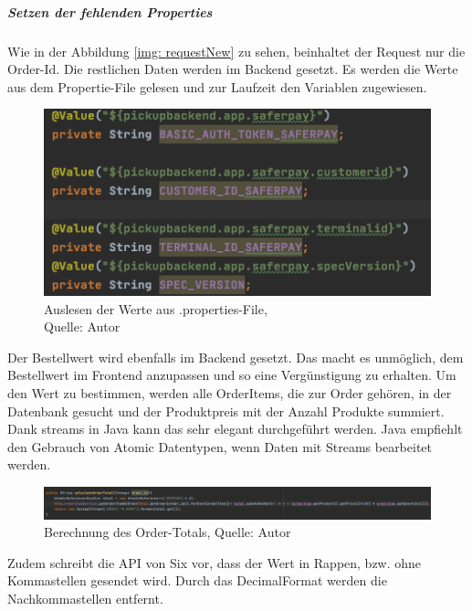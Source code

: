 \subparagraph{Setzen der fehlenden Properties}
Wie in der Abbildung \ref{img: requestNew} zu sehen, beinhaltet der Request nur die Order-Id. Die restlichen Daten werden im Backend gesetzt. Es werden die Werte aus dem \gls{Propertie-File} gelesen und zur Laufzeit den Variablen zugewiesen. 
 \begin{figure}[H]
	\centering
	\includegraphics[scale=0.4]{images/valuesFromProperties.PNG}
	\caption[Auslesen der Werte aus .properties-File]{Auslesen der Werte aus .properties-File,\\ Quelle: Autor}
	\label{img: valuesFromProperties}
\end{figure} 
Der Bestellwert wird ebenfalls im Backend gesetzt. Das macht es unmöglich, dem Bestellwert im Frontend anzupassen und so eine Vergünstigung zu erhalten. Um den Wert zu bestimmen, werden alle OrderItems, die zur Order gehören, in der Datenbank gesucht und der Produktpreis mit der Anzahl Produkte summiert. Dank streams in Java kann das sehr elegant durchgeführt werden. Java empfiehlt den Gebrauch von Atomic Datentypen, wenn Daten mit Streams bearbeitet werden. 
 \begin{figure}[H]
	\centering
	\includegraphics[width=1\textwidth]{images/calculateTotal.PNG}
	\caption[Berechnung des Order-Totals]{Berechnung des Order-Totals, Quelle: Autor}
	\label{img: orderTotal}
\end{figure} 
Zudem schreibt die API von Six vor, dass der Wert in Rappen, bzw. ohne Kommastellen gesendet wird. 
Durch das DecimalFormat werden die Nachkommastellen entfernt. 

